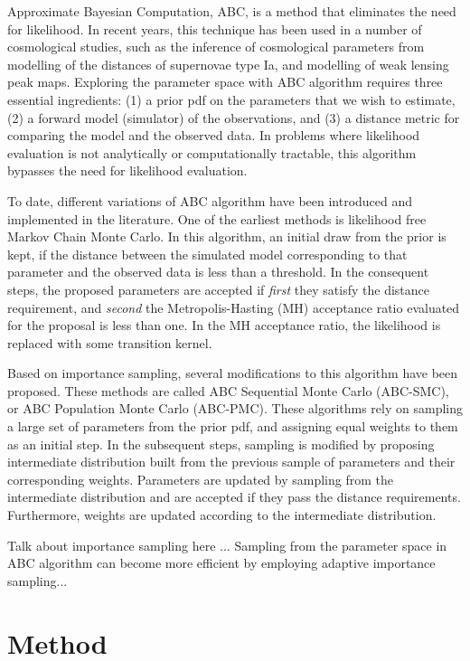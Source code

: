 \documentclass[12pt, preprint]{aastex}
\begin{document}
Approximate Bayesian Computation, ABC, is a method that eliminates the need for likelihood. 
In recent years, this technique has been used in a number of cosmological studies, such as 
the inference of cosmological parameters from modelling of the distances of supernovae type Ia, 
and modelling of weak lensing peak maps. Exploring the parameter space with ABC algorithm 
requires three essential ingredients: (1) a prior pdf on the parameters that we wish to estimate, 
(2) a forward model (simulator) of the observations, and (3) a distance metric for comparing 
the model and the observed data. In problems where likelihood evaluation is not analytically or 
computationally tractable, this algorithm bypasses the need for likelihood evaluation.

To date, different variations of ABC algorithm have been introduced  and implemented 
in the literature. One of the earliest methods is likelihood free Markov Chain Monte 
Carlo. In this algorithm, an initial draw from the prior is kept, if the distance between 
the simulated model corresponding to that parameter and the observed data is less than a threshold. 
In the consequent steps, the proposed parameters are accepted if \emph{first} they satisfy the 
distance requirement, and \emph{second} the Metropolis-Hasting (MH) acceptance ratio evaluated for the 
proposal is less than one. In the MH acceptance ratio, the likelihood is replaced with some transition 
kernel. 

Based on importance sampling, several modifications to this algorithm have been proposed. 
These methods are called ABC Sequential Monte Carlo (ABC-SMC), or ABC Population Monte Carlo 
(ABC-PMC). These algorithms rely on sampling a large set of parameters from the prior pdf, and assigning 
equal weights to them as an initial step. In the subsequent steps, sampling is modified by 
proposing intermediate distribution built from the previous sample of parameters and their 
corresponding weights. Parameters are updated by sampling from the intermediate distribution 
and are accepted if they pass the distance requirements. Furthermore, weights are updated according 
to the intermediate distribution. 

Talk about importance sampling here ...
Sampling from the parameter space in ABC algorithm can become more efficient by 
employing adaptive importance sampling... 

\section{Method}
\end{document}
